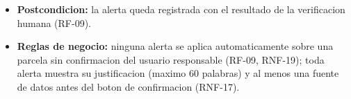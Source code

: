 \documentclass[11pt,a4paper]{article}
\begin{document}
\begin{itemize}
\begin{itemize}
  \item 3e. El usuario esta en desacuerdo con la recomendacion mas alla de un simple descarte: registra formalmente su desacuerdo, disponible para revision del equipo tecnico, y la alerta queda fuera del conjunto aplicado hasta esa revision (RF-33).
  \end{itemize}
\item \textbf{Postcondicion:} la alerta queda registrada con el resultado de la verificacion humana (RF-09).
\item \textbf{Reglas de negocio:} ninguna alerta se aplica automaticamente sobre una parcela sin confirmacion del usuario responsable (RF-09, RNF-19); toda alerta muestra su justificacion (maximo 60 palabras) y al menos una fuente de datos antes del boton de confirmacion (RNF-17).
\end{itemize}
\end{document}
